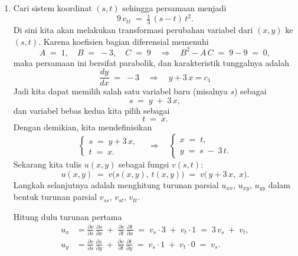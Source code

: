 \documentclass[a4paper]{article}
\theoremstyle{definition}
\begin{document}
\begin{enumerate}
  \begin{enumerate}
    \item Cari sistem koordinat \((s,t)\) sehingga persamaan menjadi
\[
9\,v_{tt} \;=\;\tfrac{1}{3}\,(s - t)\,t^{2}.
\]
Di sini kita akan melakukan transformasi perubahan variabel dari \((x,y)\) ke \((s,t)\). Karena koefisien bagian diferensial memenuhi
\[
A \;=\; 1,\quad B \;=\;-3,\quad C \;=\;9 
\quad\Longrightarrow\quad
B^{2} - A\,C \;=\;9 - 9 \;=\;0,
\]
maka persamaan ini bersifat parabolik, dan karakteristik tunggalnya adalah
\[
\frac{dy}{dx} \;=\;-3 
\quad\Longrightarrow\quad 
y + 3\,x = c_1
\]
Jadi kita dapat memilih salah satu variabel baru (misalnya \(s\)) sebagai
\[
s \;=\; y \;+\; 3\,x,
\]
dan variabel bebas kedua kita pilih sebagai
\[
t \;=\; x.
\]
Dengan demikian, kita mendefinisikan
\[
\begin{cases}
s \;=\; y + 3\,x,\\
t \;=\; x.
\end{cases}
\quad\Longrightarrow\quad
\begin{cases}
x \;=\; t,\\
y \;=\; s \;-\; 3\,t.
\end{cases}
\]
Sekarang kita tulis \(u(x,y)\) sebagai fungsi \(v(s,t)\):
\[
u(x,y)\;=\;v\bigl(s(x,y),\,t(x,y)\bigr)
\;=\;v\bigl(\,y +3\,x,\;x\bigr).
\]
Langkah selanjutnya adalah menghitung turunan parsial \(u_{xx},\,u_{xy},\,u_{yy}\) dalam bentuk turunan parsial \(v_{ss},\,v_{st},\,v_{tt}\).  

Hitung dulu turunan pertama
   \[
   \begin{aligned}
   u_{x} 
   &= \frac{\partial v}{\partial s}\,\frac{\partial s}{\partial x}
     \;+\;\frac{\partial v}{\partial t}\,\frac{\partial t}{\partial x} 
   \;=\; v_{s}\cdot 3 \;+\; v_{t}\cdot 1 
   \;=\;3\,v_{s} \;+\; v_{t},\\
   u_{y} 
   &= \frac{\partial v}{\partial s}\,\frac{\partial s}{\partial y}
     \;+\;\frac{\partial v}{\partial t}\,\frac{\partial t}{\partial y} 
   \;=\; v_{s}\cdot 1 \;+\; v_{t}\cdot 0 
   \;=\; v_{s}.
   \end{aligned}
   \]


\end{enumerate}
\end{enumerate}
\end{document}
